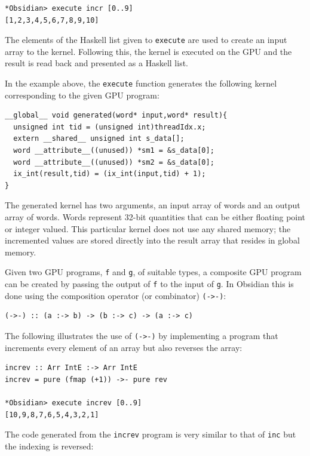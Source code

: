 \begin{small}
\begin{verbatim}
*Obsidian> execute incr [0..9]
[1,2,3,4,5,6,7,8,9,10]
\end{verbatim}
\end{small}
\noindent
The elements of the Haskell list given to {\tt execute} are used to create 
an input array to the kernel. Following this, the kernel is executed on the
GPU and the result is read back and presented as a Haskell list. 

In the example above, the {\tt execute} function generates the following kernel 
corresponding to the given GPU program:
\begin{small}
\begin{verbatim}
__global__ void generated(word* input,word* result){
  unsigned int tid = (unsigned int)threadIdx.x;
  extern __shared__ unsigned int s_data[];
  word __attribute__((unused)) *sm1 = &s_data[0];
  word __attribute__((unused)) *sm2 = &s_data[0];
  ix_int(result,tid) = (ix_int(input,tid) + 1);
}
\end{verbatim}
\end{small}
\noindent
The generated kernel has two arguments, an input array of words and an 
output array of words. Words represent 32-bit quantities that can be either
floating point or integer valued. This particular kernel does not use 
any shared memory; the incremented values are stored directly into the 
result array that resides in global memory.  

Given two GPU programs, {\tt f} and {\tt g}, of suitable types, a 
composite GPU program can be created by passing the output of {\tt f} to the 
input of {\tt g}. In Obsidian this is done using the composition operator (or combinator)
{\tt (->-)}: 


\begin{small}
\begin{verbatim}
(->-) :: (a :-> b) -> (b :-> c) -> (a :-> c)
\end{verbatim}
\end{small}
\noindent
The following illustrates the use of {\tt (->-)} by implementing a 
program that increments every element of an array but also reverses 
the array: 

\begin{small}
\begin{verbatim}
increv :: Arr IntE :-> Arr IntE 
increv = pure (fmap (+1)) ->- pure rev

*Obsidian> execute increv [0..9]
[10,9,8,7,6,5,4,3,2,1]
\end{verbatim}
\end{small}
\noindent
The code generated from the {\tt increv} program is very similar to that 
of {\tt inc} but the indexing is reversed:

